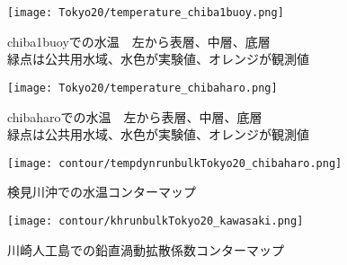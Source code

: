 \documentclass[fontsize=12pt,paper=a4]{jlreq}
\begin{document}
\begin{figure}[hbtp]
  \centering
  \texttt{[image: Tokyo20/temperature\_chiba1buoy.png]}
  \caption{chiba1buoyでの水温　左から表層、中層、底層\\緑点は公共用水域、水色が実験値、オレンジが観測値}
\end{figure}

\begin{figure}[hbtp]
  \centering
  \texttt{[image: Tokyo20/temperature\_chibaharo.png]}
  \caption{chibaharoでの水温　左から表層、中層、底層\\緑点は公共用水域、水色が実験値、オレンジが観測値}
\end{figure}


\begin{figure}[hbtp]
    \centering
    \texttt{[image: contour/tempdynrunbulkTokyo20\_chibaharo.png]}
    \caption{検見川沖での水温コンターマップ}
\end{figure}


\begin{figure}[hbtp]
  \centering
  \texttt{[image: contour/khrunbulkTokyo20\_kawasaki.png]}
  \caption{川崎人工島での鉛直渦動拡散係数コンターマップ}
\end{figure}
\end{document}
